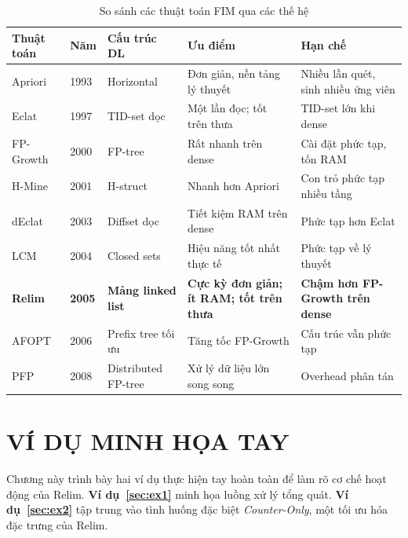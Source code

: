 \documentclass[12pt,a4paper]{report}
\begin{document}
\begin{table}[H]
  \centering
  \caption{So sánh các thuật toán FIM qua các thế hệ}
  \label{tab:algo-comparison}
  \begin{tabularx}{\textwidth}{lllXX}
    \toprule
    \textbf{Thuật toán} & \textbf{Năm} & \textbf{Cấu trúc DL} & \textbf{Ưu điểm} & \textbf{Hạn chế} \\
    \midrule
    Apriori     & 1993 & Horizontal  & Đơn giản, nền tảng lý thuyết & Nhiều lần quét, sinh nhiều ứng viên \\
    \addlinespace
    Eclat       & 1997 & TID-set dọc & Một lần đọc; tốt trên thưa   & TID-set lớn khi dense \\
    \addlinespace
    FP-Growth   & 2000 & FP-tree     & Rất nhanh trên dense         & Cài đặt phức tạp, tốn RAM \\
    \addlinespace
    H-Mine      & 2001 & H-struct    & Nhanh hơn Apriori            & Con trỏ phức tạp nhiều tầng \\
    \addlinespace
    dEclat      & 2003 & Diffset dọc & Tiết kiệm RAM trên dense     & Phức tạp hơn Eclat \\
    \addlinespace
    LCM         & 2004 & Closed sets & Hiệu năng tốt nhất thực tế   & Phức tạp về lý thuyết \\
    \addlinespace
    \textbf{Relim} & \textbf{2005} & \textbf{Mảng linked list} & \textbf{Cực kỳ đơn giản; ít RAM; tốt trên thưa} & \textbf{Chậm hơn FP-Growth trên dense} \\
    \addlinespace
    AFOPT       & 2006 & Prefix tree tối ưu & Tăng tốc FP-Growth & Cấu trúc vẫn phức tạp \\
    \addlinespace
    PFP         & 2008 & Distributed FP-tree & Xử lý dữ liệu lớn song song & Overhead phân tán \\
    \bottomrule
  \end{tabularx}
\end{table}

\chapter{VÍ DỤ MINH HỌA TAY}
 
Chương này trình bày hai ví dụ thực hiện tay hoàn toàn để làm rõ cơ chế hoạt động
của Relim. \textbf{Ví dụ~\ref{sec:ex1}} minh họa luồng xử lý tổng quát.
\textbf{Ví dụ~\ref{sec:ex2}} tập trung vào tình huống đặc biệt \textit{Counter-Only},
một tối ưu hóa đặc trưng của Relim.
 
\end{document}
